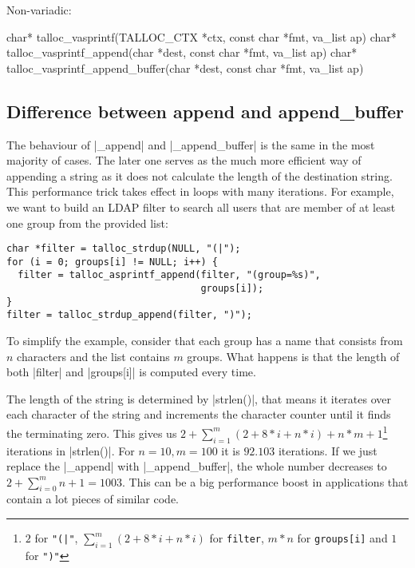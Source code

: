 Non-variadic:
\begin{funcproto}
char* talloc_vasprintf(TALLOC_CTX *ctx, const char *fmt,
                       va_list ap)
char* talloc_vasprintf_append(char *dest, const char *fmt,
                              va_list ap)
char* talloc_vasprintf_append_buffer(char *dest, const char
                                     *fmt, va_list ap)
\end{funcproto}

\subsection{Difference between append and append_buffer}

The behaviour of |_append| and |_append_buffer| is the same in the most majority
of cases. The later one serves as the much more efficient way of appending a
string as it does not calculate the length of the destination string. This
performance trick takes effect in loops with many iterations. For example, we
want to build an LDAP filter to search all users that are member of at least one
group from the provided list:

\begin{lstlisting}[caption={Appending a string},label={lst:append_buffer}]
char *filter = talloc_strdup(NULL, "(|");
for (i = 0; groups[i] != NULL; i++) {
  filter = talloc_asprintf_append(filter, "(group=%s)",
                                  groups[i]);
}
filter = talloc_strdup_append(filter, ")");
\end{lstlisting}

To simplify the example, consider that each group has a name that consists
from $n$ characters and the list contains $m$ groups. What happens is that
the length of both |filter| and |groups[i]| is computed every time.

The length of the string is determined by |strlen()|, that means it iterates
over each character of the string and increments the character counter until it
finds the terminating zero. This gives us $2 + \sum_{i=1}^m (2 + 8*i + n*i) +
n*m + 1$\footnote{$2$ for \lstinline{"(|"}, $\sum_{i=1}^m (2 + 8*i + n*i)$ for
\lstinline{filter}, $m*n$ for \lstinline{groups[i]} and $1$ for \lstinline{")"}}
iterations in |strlen()|. For $n = 10, m = 100$ it is $92.103$ iterations. If
we just replace the |_append| with |_append_buffer|, the whole number decreases
to $2 + \sum_{i=0}^m n + 1 = 1003$. This can be a big performance boost in
applications that contain a lot pieces of similar code.

